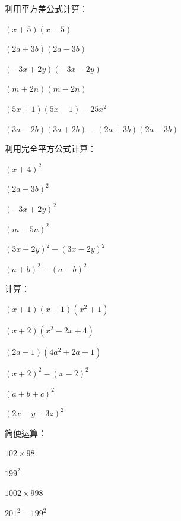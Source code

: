 \documentclass[a4paper,12pt]{ctexart}
\begin{document}
\begin{exercise}
\item 利用平方差公式计算：
  \begin{subexercise}
    \item $(x+5)(x-5)$
    \item $(2a+3b)(2a-3b)$
    \item $(-3x+2y)(-3x-2y)$
    \item $(m+2n)(m-2n)$
    \item $(5x+1)(5x-1)-25x^2$
    \item $(3a-2b)(3a+2b)-(2a+3b)(2a-3b)$
  \end{subexercise}

\item 利用完全平方公式计算：
  \begin{subexercise}
    \item $(x+4)^2$
    \item $(2a-3b)^2$
    \item $(-3x+2y)^2$
    \item $(m-5n)^2$
    \item $(3x+2y)^2-(3x-2y)^2$
    \item $(a+b)^2-(a-b)^2$
  \end{subexercise}

\item 计算：
  \begin{subexercise}
    \item $(x+1)(x-1)(x^2+1)$
    \item $(x+2)(x^2-2x+4)$
    \item $(2a-1)(4a^2+2a+1)$
    \item $(x+2)^2-(x-2)^2$
    \item $(a+b+c)^2$
    \item $(2x-y+3z)^2$
  \end{subexercise}

\item 简便运算：
  \begin{subexercise}
    \item $102\times98$
    \item $199^2$
    \item $1002\times998$
    \item $201^2-199^2$
  \end{subexercise}
\end{exercise}

\newpage

\end{document}
